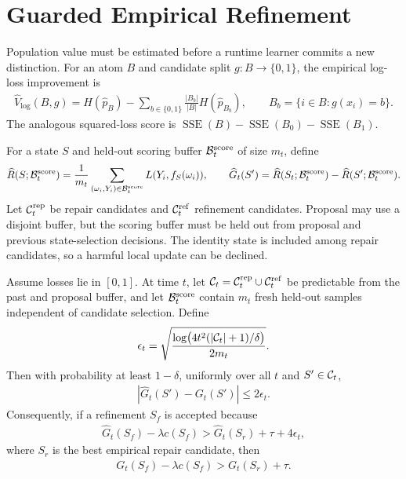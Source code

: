 \section{Guarded Empirical Refinement}
\label{sec:main-guard}

Population value must be estimated before a runtime learner commits a new distinction. For an atom $B$ and candidate split $g:B\to\{0,1\}$, the empirical log-loss improvement is
\begin{align*}
\widehat V_{\log}(B,g)
=
H(\widehat p_B)
-
\sum_{b\in\{0,1\}}
\frac{|B_b|}{|B|}H(\widehat p_{B_b}),
\qquad
B_b=\{i\in B:g(x_i)=b\}.
\end{align*}
The analogous squared-loss score is $\operatorname{SSE}(B)-\operatorname{SSE}(B_0)-\operatorname{SSE}(B_1)$.

For a state $S$ and held-out scoring buffer $\mathcal{B}_t^{\rm score}$ of size $m_t$, define
\begin{align*}
\widehat R(S;\mathcal{B}_t^{\rm score})
=
\frac1{m_t}\sum_{(\omega_i,Y_i)\in\mathcal{B}_t^{\rm score}}
L(Y_i,f_S(\omega_i)),
\qquad
\widehat G_t(S')
=
\widehat R(S_t;\mathcal{B}_t^{\rm score})
-
\widehat R(S';\mathcal{B}_t^{\rm score}).
\end{align*}
Let $\mathcal{C}_t^{\rm rep}$ be repair candidates and $\mathcal{C}_t^{\rm ref}$ refinement candidates. Proposal may use a disjoint buffer, but the scoring buffer must be held out from proposal and previous state-selection decisions. The identity state is included among repair candidates, so a harmful local update can be declined.

\begin{theorem}
\label{thm:main-guarded-refinement}
Assume losses lie in $[0,1]$. At time $t$, let $\mathcal{C}_t=\mathcal{C}_t^{\rm rep}\cup\mathcal{C}_t^{\rm ref}$ be predictable from the past and proposal buffer, and let $\mathcal{B}_t^{\rm score}$ contain $m_t$ fresh held-out samples independent of candidate selection. Define
\begin{align*}
\epsilon_t
=
\sqrt{
\frac{
\log\bigl(4t^2(|\mathcal{C}_t|+1)/\delta\bigr)
}{
2m_t
}
}.
\end{align*}
Then with probability at least $1-\delta$, uniformly over all $t$ and $S'\in\mathcal{C}_t$,
\begin{align*}
\left|\widehat G_t(S')-G_t(S')\right|
\le 2\epsilon_t.
\end{align*}
Consequently, if a refinement $S_f$ is accepted because
\begin{align*}
\widehat G_t(S_f)-\lambda c(S_f)
>
\widehat G_t(S_r)+\tau+4\epsilon_t,
\end{align*}
where $S_r$ is the best empirical repair candidate, then
\begin{align*}
G_t(S_f)-\lambda c(S_f)
>
G_t(S_r)+\tau.
\end{align*}
\end{theorem}

